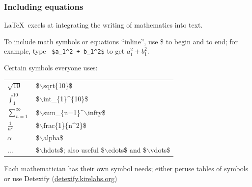 \documentclass{beamer}  %
\newcommand{\med}{\medskip}  %
\newcommand{\sm}{\smallskip}  %
\begin{document}
\frame
{
\frametitle{Including equations}

\LaTeX\ excels at integrating the writing of mathematics into text.

To include math symbols or equations ``inline'', use {\color{teal} \$} to begin and to end; for example, type {\tt {\color{teal} \$a\_1\^{}2 + b\_1\^{}2\$}} to get $a_1^2+b_1^2$.

\med
Certain symbols everyone uses:

\begin{tabular}{ll}
$\sqrt{10}$ & {\color{teal} \$$\backslash$sqrt\{10\}\$ } \sm\\
$\int_{1}^{10}$ & {\color{teal} \$$\backslash$int\_\{1\}\^{}\{10\}\$ }\sm \\
$\sum_{n=1}^\infty$ & {\color{teal} \$$\backslash$sum\_\{n=1\}\^{}$\backslash$infty\$ }\sm \\
$\frac{1}{n^2}$ & {\color{teal} \$$\backslash$frac\{1\}\{n\^{}2\}\$ }\sm \\
$\alpha$ & {\color{teal} \$$\backslash$alpha\$ } \sm \\
$\hdots$ & {\color{teal} \$$\backslash$hdots\$}; also useful {\color{teal} \$$\backslash$cdots\$} and {\color{teal} \$$\backslash$vdots\$}
\end{tabular}

\med
Each mathematician has their own symbol needs; either peruse tables of symbols or use Detexify 
{\small (\url{detexify.kirelabs.org})}\!\!

\vfill
}
\end{document}
